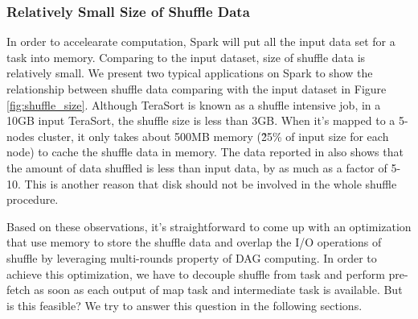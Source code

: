 \subsubsection{Relatively Small Size of Shuffle Data}\label{shufflesize}
In order to accelearate computation, Spark will put all the input data set for a task into memory. Comparing to the input dataset, size of shuffle data is relatively small. We present two typical applications on Spark to show the relationship between shuffle data comparing with the input dataset in Figure \ref{fig:shuffle_size}. Although TeraSort\cite{terasort} is known as a shuffle intensive job, in a 10GB input TeraSort, the shuffle size is less than 3GB. When it's mapped to a 5-nodes cluster, it only takes about 500MB memory (\~25\% of input size for each node) to cache the shuffle data in memory. The data reported in \cite{makingsense} also shows that the amount of data shuffled is less than input data, by as much as a factor of 5-10. This is another reason that disk should not be involved in the whole shuffle procedure.


Based on these observations, it's straightforward to come up with an optimization that use memory to store the shuffle data and overlap the I/O operations of shuffle
by leveraging multi-rounds property of DAG computing. In order to achieve this optimization, we have to decouple shuffle from task and 
perform pre-fetch as soon as each output of map task and intermediate task is available. But is this feasible? We try to answer this question
in the following sections.
